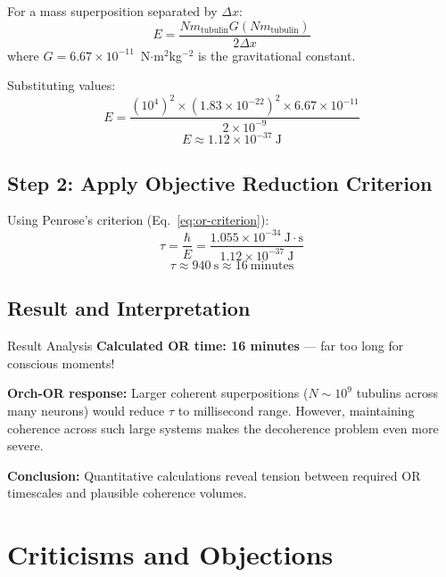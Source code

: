 For a mass superposition separated by $\Delta x$:
\begin{equation}
E = \frac{N m_{\text{tubulin}} G (N m_{\text{tubulin}})}{2\Delta x}
\end{equation}
where $G = 6.67 \times 10^{-11}$~N$\cdot$m$^2$kg$^{-2}$ is the gravitational constant.

Substituting values:
\begin{equation}
E = \frac{(10^4)^2 \times (1.83 \times 10^{-22})^2 \times 6.67 \times 10^{-11}}{2 \times 10^{-9}}
\end{equation}
\begin{equation}
E \approx 1.12 \times 10^{-37}~\text{J}
\end{equation}

\subsection*{Step 2: Apply Objective Reduction Criterion}

Using Penrose's criterion (Eq.~\ref{eq:or-criterion}):
\begin{equation}
\tau = \frac{\hbar}{E} = \frac{1.055 \times 10^{-34}~\text{J}\cdot\text{s}}{1.12 \times 10^{-37}~\text{J}}
\end{equation}
\begin{equation}
\tau \approx 940~\text{s} \approx 16~\text{minutes}
\end{equation}

\subsection*{Result and Interpretation}

\begin{calloutbox}[colback=blue!5!white,colframe=blue!75!black]{Result Analysis}
\textbf{Calculated OR time: 16 minutes} --- far too long for conscious moments!

\textbf{Orch-OR response:} Larger coherent superpositions ($N \sim 10^9$ tubulins across many neurons) would reduce $\tau$ to millisecond range. However, maintaining coherence across such large systems makes the decoherence problem even more severe.

\textbf{Conclusion:} Quantitative calculations reveal tension between required OR timescales and plausible coherence volumes.
\end{calloutbox}

\section{Criticisms and Objections}

